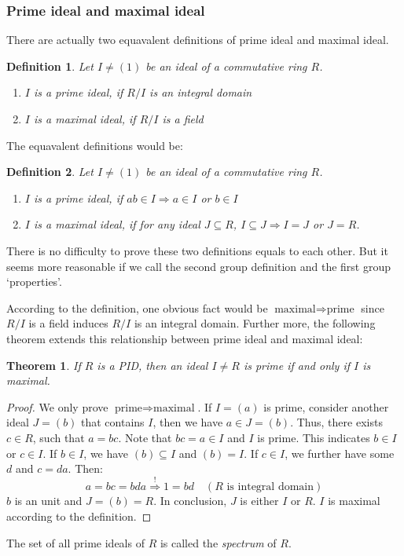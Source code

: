 \documentclass[a4paper, pdf, 11.5pt]{article}
\newtheorem{definition}{Definition}
\newtheorem{theorem}{Theorem}
\begin{document}
\subsubsection{Prime ideal and maximal ideal}
There are actually two equavalent definitions of prime ideal and maximal ideal. 
\begin{definition}
  Let $I\neq (1)$ be an ideal of a commutative ring $R$.
  \begin{enumerate}
    \item $I$ is a prime ideal, if $R/I$ is an integral domain
    \item $I$ is a maximal ideal, if $R/I$ is a field
  \end{enumerate}
\end{definition}
\noindent
The equavalent definitions would be:
\begin{definition}
  Let $I\neq (1)$ be an ideal of a commutative ring $R$.
  \begin{enumerate}
    \item $I$ is a prime ideal, if $ab\in I\Rightarrow a\in I$ or $b\in I$
    \item $I$ is a maximal ideal, if for any ideal $J\subseteq R$, $I\subseteq J\Rightarrow I=J$ or $J=R$.
  \end{enumerate}
\end{definition}
\noindent
There is no difficulty to prove these two definitions equals to each other. But it seems more reasonable if we call the
second group definition and the first group `properties'.

According to the definition, one obvious fact would be $\mbox{maximal}\Rightarrow \mbox{prime}$ since $R/I$ is a field 
induces $R/I$ is an integral domain. Further more, the following theorem extends this relationship between 
prime ideal and maximal ideal:
\begin{theorem}
  If $R$ is a PID, then an ideal $I\neq R$ is prime if and only if $I$ is maximal.
\end{theorem}
\begin{proof}
  We only prove $\mbox{prime}\Rightarrow \mbox{maximal}$. If $I=(a)$ is prime, consider another ideal $J=(b)$ 
  that contains $I$, then we have $a\in J=(b)$. Thus, there exists $c\in R$, such that $a=bc$. Note that $bc=a\in I$ and 
  $I$ is prime. This indicates $b\in I$ or $c\in I$. If $b\in I$, we have $(b)\subseteq I$ and $(b)=I$. If $c\in I$, we further
  have some $d$ and $c = da$. Then:
  $$ a = bc = bda \stackrel{!}{\Longrightarrow} 1 = bd\quad(\mbox{$R$ is integral domain})
  $$
  $b$ is an unit and $J=(b)=R$. In conclusion, $J$ is either $I$ or $R$. 
  $I$ is maximal according to the definition.
\end{proof}
The set of all prime ideals of $R$ is called the \textit{spectrum} of $R$.
\end{document}
